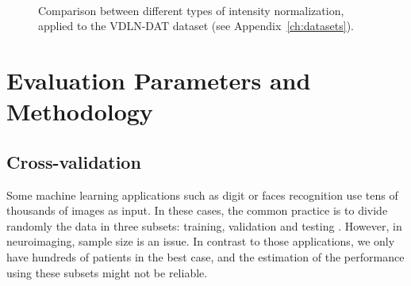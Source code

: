 \begin{figure}[bth]
	\myfloatalign
	\quad
	\\
	\caption{Comparison between different types of intensity normalization, applied to the VDLN-DAT dataset (see Appendix~\ref{ch:datasets}).}\label{fig:comparisonIntNorm}
\end{figure}

\section{Evaluation Parameters and Methodology}\label{sec:validation}
\subsection{Cross-validation}
Some machine learning applications such as digit or faces recognition use tens of thousands of images as input. In these cases, the common practice is to divide randomly the data in three subsets: training, validation and testing \cite{Bradley1997}. However, in neuroimaging, sample size is an issue. In contrast to those applications, we only have hundreds of patients in the best case, and the estimation of the performance using these subsets might not be reliable. 
 
